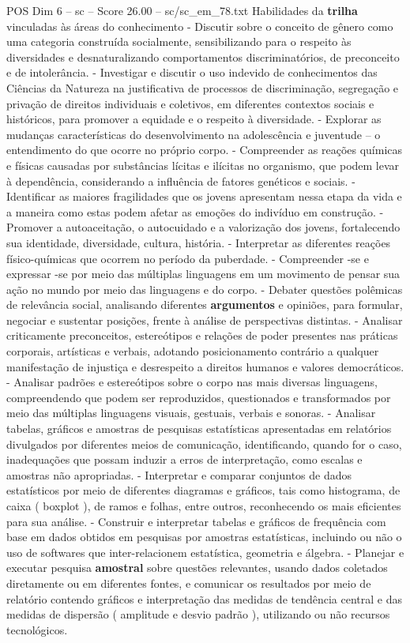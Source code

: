 \begin{textsample}{POS Dim 6 – sc – Score 26.00 – sc/sc\_em\_78.txt}
Habilidades da \textbf{trilha} vinculadas às áreas do conhecimento - Discutir sobre o conceito de gênero como uma categoria construída socialmente, sensibilizando para o respeito às diversidades e desnaturalizando comportamentos discriminatórios, de preconceito e de intolerância. - Investigar e discutir o uso indevido de conhecimentos das Ciências da Natureza na justificativa de processos de discriminação, segregação e privação de direitos individuais e coletivos, em diferentes contextos sociais e históricos, para promover a equidade e o respeito à diversidade. - Explorar as mudanças características do desenvolvimento na adolescência e juventude – o entendimento do que ocorre no próprio corpo. - Compreender as reações químicas e físicas causadas por substâncias lícitas e ilícitas no organismo, que podem levar à dependência, considerando a influência de fatores genéticos e sociais. - Identificar as maiores fragilidades que os jovens apresentam nessa etapa da vida e a maneira como estas podem afetar as emoções do indivíduo em construção. - Promover a autoaceitação, o autocuidado e a valorização dos jovens, fortalecendo sua identidade, diversidade, cultura, história. - Interpretar as diferentes reações físico-químicas que ocorrem no período da puberdade. - Compreender -se e expressar -se por meio das múltiplas linguagens em um movimento de pensar sua ação no mundo por meio das linguagens e do corpo. - Debater questões polêmicas de relevância social, analisando diferentes \textbf{argumentos} e opiniões, para formular, negociar e sustentar posições, frente à análise de perspectivas distintas. - Analisar criticamente preconceitos, estereótipos e relações de poder presentes nas práticas corporais, artísticas e verbais, adotando posicionamento contrário a qualquer manifestação de injustiça e desrespeito a direitos humanos e valores democráticos. - Analisar padrões e estereótipos sobre o corpo nas mais diversas linguagens, compreendendo que podem ser reproduzidos, questionados e transformados por meio das múltiplas linguagens visuais, gestuais, verbais e sonoras. - Analisar tabelas, gráficos e amostras de pesquisas estatísticas apresentadas em relatórios divulgados por diferentes meios de comunicação, identificando, quando for o caso, inadequações que possam induzir a erros de interpretação, como escalas e amostras não apropriadas. - Interpretar e comparar conjuntos de dados estatísticos por meio de diferentes diagramas e gráficos, tais como histograma, de caixa ( boxplot ), de ramos e folhas, entre outros, reconhecendo os mais eficientes para sua análise. - Construir e interpretar tabelas e gráficos de frequência com base em dados obtidos em pesquisas por amostras estatísticas, incluindo ou não o uso de softwares que inter-relacionem estatística, geometria e álgebra. - Planejar e executar pesquisa \textbf{amostral} sobre questões relevantes, usando dados coletados diretamente ou em diferentes fontes, e comunicar os resultados por meio de relatório contendo gráficos e interpretação das medidas de tendência central e das medidas de dispersão ( amplitude e desvio padrão ), utilizando ou não recursos tecnológicos.

\end{textsample}
